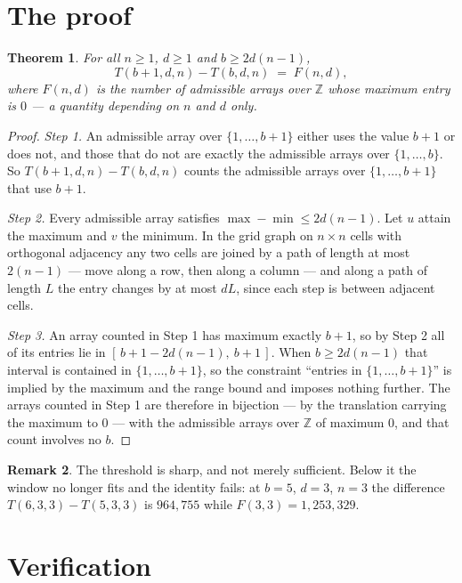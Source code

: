 \documentclass[11pt,a4paper]{article}
\theoremstyle{plain}
\newtheorem{theorem}{Theorem}
\theoremstyle{definition}
\newtheorem{remark}[theorem]{Remark}
\begin{document}
\section{The proof}

\begin{theorem}
For all $n\ge1$, $d\ge1$ and $b\ge 2d(n-1)$,
\[
T(b+1,d,n)-T(b,d,n)\;=\;F(n,d),
\]
where $F(n,d)$ is the number of admissible arrays over $\mathbb{Z}$ whose maximum entry is
$0$ --- a quantity depending on $n$ and $d$ only.
\end{theorem}

\begin{proof}
\emph{Step 1.} An admissible array over $\{1,\dots,b+1\}$ either uses the value $b+1$ or
does not, and those that do not are exactly the admissible arrays over $\{1,\dots,b\}$. So
$T(b+1,d,n)-T(b,d,n)$ counts the admissible arrays over $\{1,\dots,b+1\}$ that use $b+1$.

\emph{Step 2.} Every admissible array satisfies $\max-\min\le 2d(n-1)$. Let $u$ attain the
maximum and $v$ the minimum. In the grid graph on $n\times n$ cells with orthogonal adjacency
any two cells are joined by a path of length at most $2(n-1)$ --- move along a row, then along
a column --- and along a path of length $L$ the entry changes by at most $dL$, since each step
is between adjacent cells.

\emph{Step 3.} An array counted in Step 1 has maximum exactly $b+1$, so by Step 2 all of its
entries lie in $[\,b+1-2d(n-1),\ b+1\,]$. When $b\ge 2d(n-1)$ that interval is contained in
$\{1,\dots,b+1\}$, so the constraint ``entries in $\{1,\dots,b+1\}$'' is implied by the
maximum and the range bound and imposes nothing further. The arrays counted in Step 1 are
therefore in bijection --- by the translation carrying the maximum to $0$ --- with the
admissible arrays over $\mathbb{Z}$ of maximum $0$, and that count involves no $b$.
\end{proof}

\begin{remark}
The threshold is sharp, and not merely sufficient. Below it the window no longer fits and the
identity fails: at $b=5$, $d=3$, $n=3$ the difference $T(6,3,3)-T(5,3,3)$ is $964{,}755$
while $F(3,3)=1{,}253{,}329$.
\end{remark}

\section{Verification}
\end{document}
